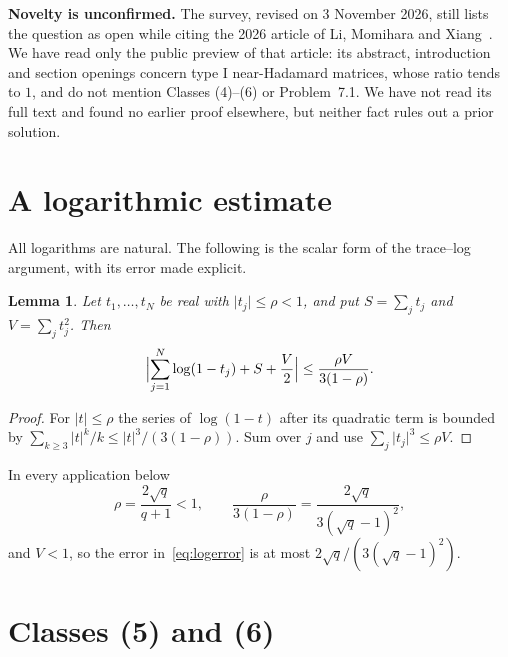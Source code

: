 \documentclass[11pt]{article}
\newtheorem{lemma}[theorem]{Lemma}
\newcommand{\abs}[1]{\lvert#1\rvert}
\begin{document}
\textbf{Novelty is unconfirmed.} The survey, revised on 3 November 2026,
still lists the question as open while citing the 2026 article of Li,
Momihara and Xiang~\cite{LMX}. We have read only the public preview of that
article: its abstract, introduction and section openings concern type I
near-Hadamard matrices, whose ratio tends to $1$, and do not mention
Classes (4)--(6) or Problem~7.1. We have not read its full text and found
no earlier proof elsewhere, but neither fact rules out a prior solution.

\section{A logarithmic estimate}\label{sec:lemma}

All logarithms are natural. The following is the scalar form of the
trace--log argument, with its error made explicit.

\begin{lemma}\label{lem:log}
Let $t_1,\ldots,t_N$ be real with $\abs{t_j}\le\rho<1$, and put
$S=\sum_jt_j$ and $V=\sum_jt_j^2$. Then
\begin{equation}\label{eq:logerror}
 \Bigl|\sum_{j=1}^N\log(1-t_j)+S+\frac V2\Bigr|
 \le\frac{\rho V}{3(1-\rho)}.
\end{equation}
\end{lemma}
\begin{proof}
For $\abs t\le\rho$ the series of $\log(1-t)$ after its quadratic term is
bounded by $\sum_{k\ge3}\abs t^k/k\le\abs t^3/(3(1-\rho))$. Sum over $j$
and use $\sum_j\abs{t_j}^3\le\rho V$.
\end{proof}

In every application below
\begin{equation}\label{eq:rho}
 \rho=\frac{2\sqrt q}{q+1}<1,
 \qquad \frac{\rho}{3(1-\rho)}=\frac{2\sqrt q}{3(\sqrt q-1)^2},
\end{equation}
and $V<1$, so the error in~\eqref{eq:logerror} is at most
$2\sqrt q/(3(\sqrt q-1)^2)$.

\section{Classes (5) and (6)}\label{sec:56}
\end{document}
